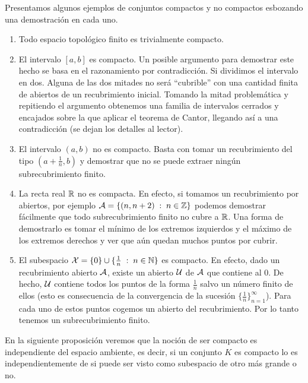 \begin{exa} Presentamos algunos ejemplos de conjuntos compactos y no compactos esbozando una demostración en cada uno.
	\begin{enumerate}
		\item Todo espacio topológico finito es trivialmente compacto.
		\item El intervalo $[a,b]$ es compacto. Un posible argumento para demostrar este hecho se basa en el razonamiento por contradicción. Si dividimos el intervalo en dos. Alguna de las dos mitades no será ``cubrible'' con una cantidad finita de abiertos de un recubrimiento inicial. Tomando la mitad problemática y repitiendo el argumento obtenemos una familia de intervalos cerrados y encajados sobre la que aplicar el teorema de Cantor, llegando así a una contradicción (se dejan los detalles al lector). 
		\item El intervalo $(a,b)$ no es compacto. Basta con tomar un recubrimiento del tipo $(a+\frac{1}{n},b)$ y demostrar que no se puede extraer ningún subrecubrimiento finito.
		\item La recta real $\mathbb{R}$ no es compacta. En efecto, si tomamos un recubrimiento por abiertos, por ejemplo $\mathcal{A}=\{(n,n+2) \;:\; n \in \mathbb{Z}\}$ podemos demostrar fácilmente que todo subrecubrimiento finito no cubre a $\mathbb{R}$. Una forma de demostrarlo es tomar el mínimo de los extremos izquierdos y el máximo de los extremos derechos y ver que aún quedan muchos puntos por cubrir.
		\item El subespacio $\mathcal{X} = \{0\} \cup \{\frac{1}{n} \;:\; n \in \mathbb{N}\}$ es compacto. En efecto, dado un recubrimiento abierto $\mathcal{A}$, existe un abierto $\mathcal{U}$ de $\mathcal{A}$ que contiene al $0$. De hecho, $\mathcal{U}$ contiene todos los puntos de la forma $\frac{1}{n}$ salvo un número finito de ellos (esto es consecuencia de la convergencia de la sucesión $\{\frac{1}{n}\}_{n=1}^\infty$). Para cada uno de estos puntos cogemos un abierto del recubrimiento. Por lo tanto tenemos un subrecubrimiento finito. \qedhere
	\end{enumerate}
\end{exa}
En la siguiente proposición veremos que la noción de ser compacto es independiente del espacio ambiente, es decir, si un conjunto $K$ es compacto lo es independientemente de si puede ser visto como subespacio de otro más grande o no.

